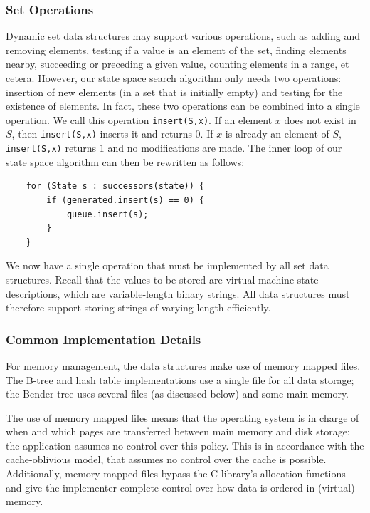 \documentclass{acm_proc_article-sp}
\begin{document}
\subsubsection{Set Operations}
Dynamic set data structures may support various operations, such as adding and removing elements, testing if a value is an element of the set, finding elements nearby, succeeding or preceding a given value, counting elements in a range, et cetera. However, our state space search algorithm only needs two operations: insertion of new elements (in a set that is initially empty) and testing for the existence of elements. In fact, these two operations can be combined into a single operation. We call this operation \verb#insert(S,x)#. If an element $x$ does not exist in $S$, then \verb#insert(S,x)# inserts it and returns $0$. If $x$ is already an element of $S$, \verb#insert(S,x)# returns $1$ and no modifications are made. The inner loop of our state space algorithm can then be rewritten as follows:
\begin{verbatim}
    for (State s : successors(state)) {
        if (generated.insert(s) == 0) {
            queue.insert(s);
        }
    }
\end{verbatim}

We now have a single operation that must be implemented by all set data structures. Recall that the values to be stored are virtual machine state descriptions, which are variable-length binary strings. All data structures must therefore support storing strings of varying length efficiently.

\subsubsection{Common Implementation Details}
For memory management, the data structures make use of memory mapped files.
The B-tree and hash table implementations use a single file for all data storage;
the Bender tree uses several files (as discussed below) and some main memory.

The use of memory mapped files means that the operating system is in charge of
when and which pages are transferred between main memory and disk storage; the
application assumes no control over this policy. This is in accordance with the
cache-oblivious model, that assumes no control over the cache is possible.
Additionally, memory mapped files bypass the C library's allocation functions
and give the implementer complete control over how data is ordered in (virtual)
memory.
\end{document}

